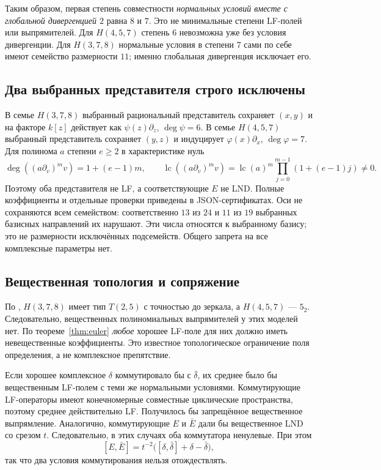 Таким образом, первая степень совместности \emph{нормальных условий
вместе с глобальной дивергенцией $2$} равна $8$ и $7$.
Это не минимальные степени LF-полей или выпрямителей.
Для $H(4,5,7)$ степень $6$ невозможна уже без условия дивергенции.
Для $H(3,7,8)$ нормальные условия в степени $7$ сами по себе имеют
семейство размерности $11$; именно глобальная дивергенция исключает его.

\subsection{Два выбранных представителя строго исключены}
В семье $H(3,7,8)$ выбранный рациональный представитель сохраняет
$(x,y)$ и на факторе $k[z]$ действует как $\psi(z)\partial_z$,
$\deg\psi=6$. В семье $H(4,5,7)$ выбранный представитель сохраняет
$(y,z)$ и индуцирует $\varphi(x)\partial_x$, $\deg\varphi=7$.
Для полинома $a$ степени $e\ge2$ в характеристике нуль
\[
\deg((a\partial_v)^m v)=1+(e-1)m,\qquad
\operatorname{lc}((a\partial_v)^m v)
=\operatorname{lc}(a)^m\prod_{j=0}^{m-1}(1+(e-1)j)\ne0.
\]
Поэтому оба представителя не LF, а соответствующие $E$ не LND.
Полные коэффициенты и отдельные проверки приведены в JSON-сертификатах.
Оси не сохраняются всем семейством: соответственно $13$ из $24$ и
$11$ из $19$ выбранных базисных направлений их нарушают.
Эти числа относятся к выбранному базису; это не размерности
исключённых подсемейств. Общего запрета на все комплексные параметры нет.

\subsection{Вещественная топология и сопряжение}
По \cite[с.~2, рис.~3]{KP}, $H(3,7,8)$ имеет тип $T(2,5)$
с точностью до зеркала, а $H(4,5,7)$ --- $5_2$.
Следовательно, вещественных полиномиальных выпрямителей у этих моделей
нет. По теореме~\ref{thm:euler} \emph{любое} хорошее LF-поле для них
должно иметь невещественные коэффициенты. Это известное топологическое
ограничение поля определения, а не комплексное препятствие.

Если хорошее комплексное $\delta$ коммутировало бы с $\bar\delta$,
их среднее было бы вещественным LF-полем с теми же нормальными
условиями. Коммутирующие LF-операторы имеют конечномерные совместные
циклические пространства, поэтому среднее действительно LF.
Получилось бы запрещённое вещественное выпрямление. Аналогично,
коммутирующие $E$ и $\bar E$ дали бы вещественное LND со срезом $t$.
Следовательно, в этих случаях оба коммутатора ненулевые. При этом
\[
[E,\bar E]=t^{-2}\bigl([\delta,\bar\delta]+\delta-\bar\delta\bigr),
\]
так что два условия коммутирования нельзя отождествлять.
